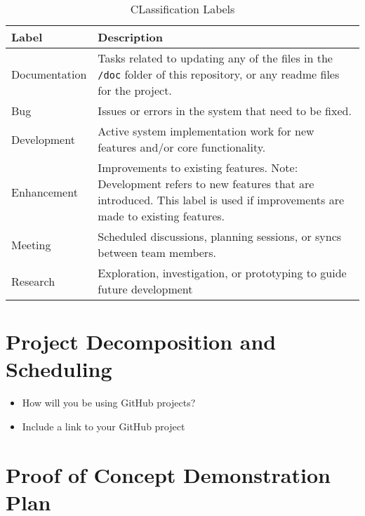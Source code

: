 \documentclass{article}
\begin{document}
\begin{table}[h!]
\centering
\begin{tabular}{|l|p{10cm}|}
\hline
\textbf{Label} & \textbf{Description} \\ \hline
Documentation & Tasks related to updating any of the files in the \texttt{/doc} folder of this repository, or any readme files for the project. \\ \hline
Bug & Issues or errors in the system that need to be fixed. \\ \hline
Development & Active system implementation work for new features and/or core functionality. \\ \hline
Enhancement & Improvements to existing features. Note: Development refers to new features that are introduced. This label is used if improvements are made to existing features. \\ \hline
Meeting & Scheduled discussions, planning sessions, or syncs between team members. \\ \hline
Research & Exploration, investigation, or prototyping to guide future development \\ \hline
\end{tabular}
\caption{CLassification Labels}
\end{table}



\section{Project Decomposition and Scheduling}

\begin{itemize}
  \item How will you be using GitHub projects?
  \item Include a link to your GitHub project
\end{itemize}


\section{Proof of Concept Demonstration Plan}

\end{document}
